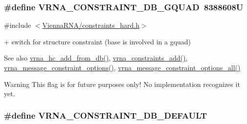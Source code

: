 \subsubsection[{V\+R\+N\+A\+\_\+\+C\+O\+N\+S\+T\+R\+A\+I\+N\+T\+\_\+\+D\+B\+\_\+\+G\+Q\+U\+A\+D}]{\setlength{\rightskip}{0pt plus 5cm}\#define V\+R\+N\+A\+\_\+\+C\+O\+N\+S\+T\+R\+A\+I\+N\+T\+\_\+\+D\+B\+\_\+\+G\+Q\+U\+A\+D~8388608\+U}\label{group__hard__constraints_ga75cfab03cdc97c95b3ce8bb29f52b08e}


{\ttfamily \#include $<$\hyperlink{constraints__hard_8h}{Vienna\+R\+N\+A/constraints\+\_\+hard.\+h}$>$}



\textquotesingle{}+\textquotesingle{} switch for structure constraint (base is involved in a gquad) 

\begin{DoxySeeAlso}{See also}
\hyperlink{group__hard__constraints_ga5b4de3247b67358080c176b94591a8e6}{vrna\+\_\+hc\+\_\+add\+\_\+from\+\_\+db()}, \hyperlink{group__constraints_ga35a401f680969a556858a8dd5f1d07cc}{vrna\+\_\+constraints\+\_\+add()}, \hyperlink{group__constraints_gaa1f20b53bf09ac2e6b0dbb13f7d89670}{vrna\+\_\+message\+\_\+constraint\+\_\+options()}, \hyperlink{group__constraints_gaec7e13fa0465c2acc7a621d1aecb709f}{vrna\+\_\+message\+\_\+constraint\+\_\+options\+\_\+all()}
\end{DoxySeeAlso}
\begin{DoxyWarning}{Warning}
This flag is for future purposes only! No implementation recognizes it yet. 
\end{DoxyWarning}
\hypertarget{group__hard__constraints_ga1c3864bdc92147a4d93de2b1b4356177}{}
\subsubsection[{V\+R\+N\+A\+\_\+\+C\+O\+N\+S\+T\+R\+A\+I\+N\+T\+\_\+\+D\+B\+\_\+\+D\+E\+F\+A\+U\+L\+T}]{\setlength{\rightskip}{0pt plus 5cm}\#define V\+R\+N\+A\+\_\+\+C\+O\+N\+S\+T\+R\+A\+I\+N\+T\+\_\+\+D\+B\+\_\+\+D\+E\+F\+A\+U\+L\+T}\label{group__hard__constraints_ga1c3864bdc92147a4d93de2b1b4356177}


